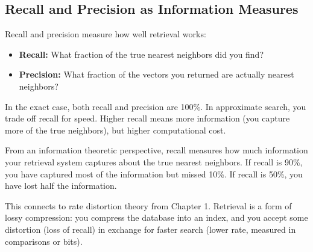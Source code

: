 \vspace{1.5em}

\subsection{Recall and Precision as Information Measures}

Recall and precision measure how well retrieval works:

\begin{itemize}
\item \textbf{Recall:} What fraction of the true nearest neighbors did you find?

\item \textbf{Precision:} What fraction of the vectors you returned are actually nearest neighbors?
\end{itemize}

\vspace{1em}

In the exact case, both recall and precision are 100\%. In approximate search, you trade off recall for speed. Higher recall means more information (you capture more of the true neighbors), but higher computational cost.

From an information theoretic perspective, recall measures how much information your retrieval system captures about the true nearest neighbors. If recall is 90\%, you have captured most of the information but missed 10\%. If recall is 50\%, you have lost half the information.

\vspace{1em}

This connects to rate distortion theory from Chapter 1. Retrieval is a form of lossy compression: you compress the database into an index, and you accept some distortion (loss of recall) in exchange for faster search (lower rate, measured in comparisons or bits).

\vspace{2em}


